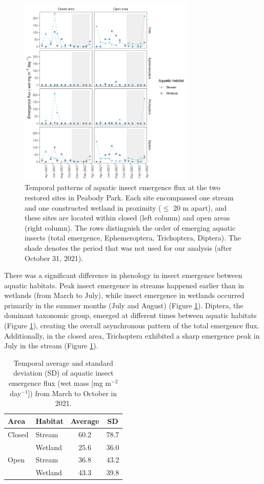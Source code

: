\documentclass[11pt, class=article, crop=false]{standalone}
\begin{document}
\begin{figure}
    \centering
    \includegraphics[width=0.75\textwidth]{figure_emg.png}
    \caption{Temporal patterns of aquatic insect emergence flux at the two restored sites in Peabody Park. Each site encompassed one stream and one constructed wetland in proximity ($\le$ 20 m apart), and these sites are located within closed (left column) and open areas (right column).
    The rows distinguish the order of emerging aquatic insects (total emergence, Ephemeroptera, Trichoptera, Diptera).
    The shade denotes the period that was not used for our analysis (after October 31, 2021).}
    \label{fig:insect-phenology}
\end{figure}

There was a significant difference in phenology in insect emergence between aquatic habitats.
Peak insect emergence in streams happened earlier than in wetlands (from March to July), while insect emergence in wetlands occurred primarily in the summer months (July and August) (Figure \ref{fig:insect-phenology}).
Diptera, the dominant taxonomic group, emerged at different times between aquatic habitats (Figure \ref{fig:insect-phenology}), creating the overall asynchronous pattern of the total emergence flux.
Additionally, in the closed area, Trichoptera exhibited a sharp emergence peak in July in the stream (Figure \ref{fig:insect-phenology}).

% 
\begin{table}[ht]
\centering
\caption{Temporal average and standard deviation (SD) of aquatic insect emergence flux (wet mass [mg m$^{-2}$ day$^{-1}$]) from March to October in 2021.} 
\label{tab:emg}
\begingroup\small
\begin{tabular}{llcc}
  \hline
Area & Habitat & Average & SD \\ 
  \hline
Closed & Stream & 60.2 & 78.7 \\ 
   & Wetland & 25.6 & 36.0 \\ 
  Open & Stream & 36.8 & 43.2 \\ 
   & Wetland & 43.3 & 39.8 \\ 
   \hline
\end{tabular}
\endgroup
\end{table}
\end{document}
